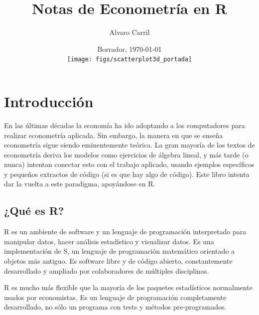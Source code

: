 \documentclass[12pt]{report}\usepackage[]{graphicx}\usepackage[]{color}
\title{Notas de Econometría en R}
\author{Alvaro Carril}
\date{Borrador, \today \\
  \texttt{[image: figs/scatterplot3d\_portada]}
}
\begin{document}
\maketitle
\tableofcontents

\clearpage




\chapter{Introducción}

En las últimas décadas la economía ha ido adoptando a los computadores para realizar econometría aplicada.
Sin embargo, la manera en que se enseña econometría sigue siendo eminentemente teórica.
La gran mayoría de los textos de econometría deriva los modelos como ejercicios de álgebra lineal, y más tarde (o nunca) intentan conectar esto con el trabajo aplicado, usando ejemplos específicos y pequeños extractos de código (si es que hay algo de código).
Este libro intenta dar la vuelta a este paradigma, apoyándose en R.



\section{¿Qué es R?}

R es un ambiente de software y un lenguaje de programación interpretado para manipular datos, hacer análisis estadístico y visualizar datos. Es una implementación de S, un lenguaje de programación matemático orientado a objetos más antiguo. Es software libre y de código abierto, constantemente desarrollado y ampliado por colaboradores de múltiples disciplinas.

R es mucho más flexible que la mayoría de los paquetes estadísticos normalmente usados por economistas. Es un lenguaje de programación completamente desarrollado, no sólo un programa con tests y métodos pre-programados.
\end{document}
